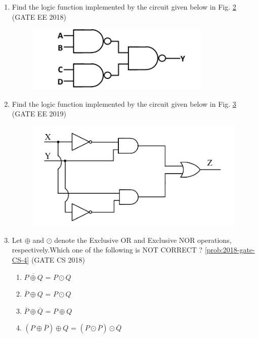 \begin{enumerate}
\begin{figure}[H]
\caption{}
\label{fig:2018-gate-ec-31}
\end{figure}
\item 
\label{prob:2018-gate-ee-14}
Find the logic function implemented by the circuit given below 
in Fig.
\ref{fig:2018-gate-ee-14}
\hfill (GATE EE 2018)
\begin{figure}[H]
\centering
	\includegraphics[width=\columnwidth]{figs/2018-gate-ee-14.png}
\caption{}
\label{fig:2018-gate-ee-14}
\end{figure}
\item 
\label{prob:2019-gate-ee-36}
Find the logic function implemented by the circuit given below 
in Fig.
\ref{fig:2019-gate-ee-36}
\hfill (GATE EE 2019)
\begin{figure}[H]
\centering
	\includegraphics[width=\columnwidth]{figs/2019-gate-ee-36.png}
\caption{}
\label{fig:2019-gate-ee-36}
\end{figure}
\item 
\label{prob:2018-gate-CS-4}		
Let $\oplus$ and $\odot$ denote the Exclusive OR and Exclusive NOR operations, respectively.Which one of the following is NOT CORRECT ?
\ref{prob:2018-gate-CS-4}
\hfill (GATE CS 2018)
\begin{samepage}
\begin{enumerate}[label=(\Alph*)]
    \item $\overline{P\oplus Q}$ = $ P \odot Q $
    \item $\overline{P} \oplus Q$ = $ P \odot Q $
    \item $\overline{P} \oplus \overline{Q}$ = $ P \oplus Q $
    \item $(P \oplus \overline{P}) \oplus Q$ = $(P \odot \overline{P}) \odot \overline{Q}$
\end{enumerate}
\end{samepage}


\end{enumerate}
